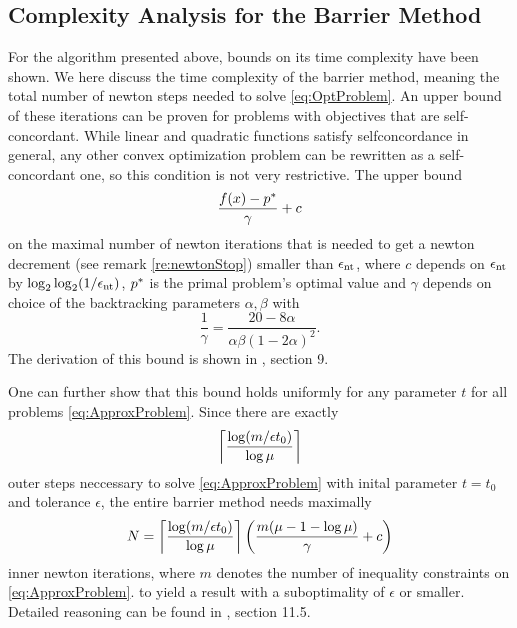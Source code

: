 \subsection{Complexity Analysis for the Barrier Method}
For the algorithm presented above, bounds on its time complexity have been shown.
We here discuss the time complexity of the barrier method, meaning the total number of newton steps needed to solve \eqref{eq:OptProblem}. 
An upper bound of these iterations can be proven for problems with objectives that are self-concordant. While linear and quadratic functions satisfy selfconcordance in general, any other convex optimization problem can be rewritten as a self-concordant one, so this condition is not very restrictive.
The upper bound
\begin{equation} %
\frac{\fx - \popt}{\gamma} + c
\end{equation}
on the maximal number of newton iterations that is needed to get a newton decrement (see remark \ref{re:newtonStop}) smaller than $ \epsnt $, where $ c $ depends on $  \epsnt $ by $ \log_2 \log_2(1/\epsnt) $, $ \popt $ is the primal problem's  optimal value and $ \gamma $ depends on choice of the backtracking parameters $ \alpha, \beta $ with\[ \frac{1}{\gamma} = \frac{20-8\alpha}{\alpha \beta (1-2\alpha)^2}.\]
The derivation of this bound is shown in \cite{BV}, section 9.

One can further show that this bound holds uniformly for any parameter $ t $ for all problems \eqref{eq:ApproxProblem}.
Since there are exactly \[ \ceil*{ \frac{\log(m/\epsilon t_0)}{\log \mu}} \] outer steps neccessary to solve  \eqref{eq:ApproxProblem} with inital parameter $ t=t_0  $ and tolerance $ \epsilon $, the entire barrier method needs maximally
\[ N = \ceil*{\frac{\log(m/\epsilon t_0)}{\log \mu}}\left( \frac{m(\mu - 1 -\log \mu)}{\gamma} + c\right)  \]   inner newton iterations, where $ m $ denotes the number of inequality constraints on  \eqref{eq:ApproxProblem}. to yield a result with a suboptimality of $ \epsilon $ or smaller. Detailed reasoning can be found in \cite{BV}, section 11.5. 




